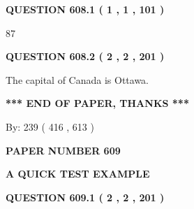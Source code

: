 \documentclass[12pt]{article}
\begin{document}
{\textbf{\Large{QUESTION
608.1 
 ( 1 , 1 , 101 )
}}}
  
  
 
 
\noindent{}

87
 
 
  
\vspace{0.2in}
  
{\textbf{\Large{QUESTION
608.2 
 ( 2 , 2 , 201 )
}}}
  
  
 
 
\noindent{}
 
 
The capital of Canada is Ottawa.
 
 
 
 
   
   
 \vspace{0.2in}
 
   
   
   
   
\vspace{1.0in} 
{\textbf{\large{ *** END OF PAPER, THANKS *** }}} 
   
   
\hspace{1.0in} By: 
 239 ( 416 ,  613 )
   
   
   
   
\newpage 
\setcounter{page}{ 
   609001 } 
   
   
   
   
 {\textbf{ \Large{ PAPER NUMBER  609  }}}
   
   
\vspace{0.2in}
   
   
   
   
   
   
 \vspace{0.2in}
{\LARGE {\textbf{ A QUICK TEST EXAMPLE}}}
   
   
  
\vspace{0.2in}
  
{\textbf{\Large{QUESTION
609.1 
 ( 2 , 2 , 201 )
}}}
  
  
 
 
\noindent{}
 
\end{document}
